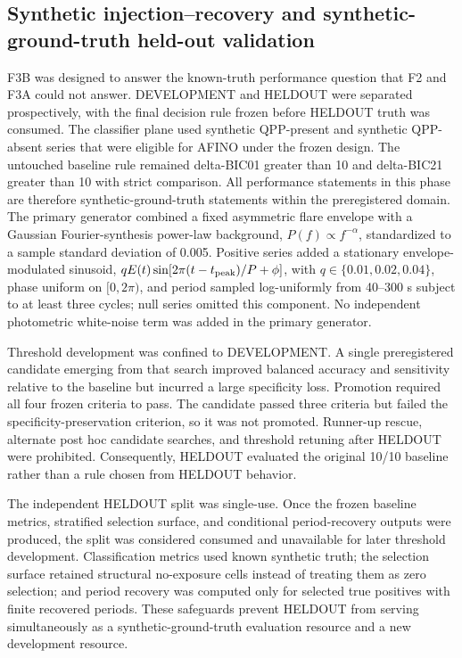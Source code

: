 \documentclass[manuscript,linenumbers]{aastex702}
\begin{document}
\subsection{Synthetic injection--recovery and synthetic-ground-truth held-out validation}
F3B was designed to answer the known-truth performance question that F2 and F3A could not answer. DEVELOPMENT and HELDOUT were separated prospectively, with the final decision rule frozen before HELDOUT truth was consumed. The classifier plane used synthetic QPP-present and synthetic QPP-absent series that were eligible for AFINO under the frozen design. The untouched baseline rule remained delta-BIC01 greater than 10 and delta-BIC21 greater than 10 with strict comparison. All performance statements in this phase are therefore synthetic-ground-truth statements within the preregistered domain. The primary generator combined a fixed asymmetric flare envelope with a Gaussian Fourier-synthesis power-law background, $P(f)\propto f^{-\alpha}$, standardized to a sample standard deviation of 0.005. Positive series added a stationary envelope-modulated sinusoid, $qE(t)\sin[2\pi(t-t_{\rm peak})/P+\phi]$, with $q\in\{0.01,0.02,0.04\}$, phase uniform on $[0,2\pi)$, and period sampled log-uniformly from 40--300 s subject to at least three cycles; null series omitted this component. No independent photometric white-noise term was added in the primary generator.

Threshold development was confined to DEVELOPMENT. A single preregistered candidate emerging from that search improved balanced accuracy and sensitivity relative to the baseline but incurred a large specificity loss. Promotion required all four frozen criteria to pass. The candidate passed three criteria but failed the specificity-preservation criterion, so it was not promoted. Runner-up rescue, alternate post hoc candidate searches, and threshold retuning after HELDOUT were prohibited. Consequently, HELDOUT evaluated the original 10/10 baseline rather than a rule chosen from HELDOUT behavior.

The independent HELDOUT split was single-use. Once the frozen baseline metrics, stratified selection surface, and conditional period-recovery outputs were produced, the split was considered consumed and unavailable for later threshold development. Classification metrics used known synthetic truth; the selection surface retained structural no-exposure cells instead of treating them as zero selection; and period recovery was computed only for selected true positives with finite recovered periods. These safeguards prevent HELDOUT from serving simultaneously as a synthetic-ground-truth evaluation resource and a new development resource.
\end{document}
